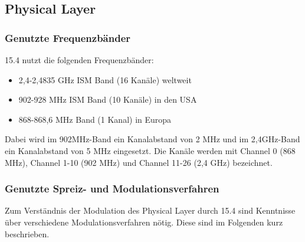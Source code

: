 \subsection{Physical Layer}
\subsubsection{Genutzte Frequenzbänder}
15.4 nutzt die folgenden Frequenzbänder:
\begin{itemize}
	\item 2,4-2,4835 GHz ISM Band (16 Kanäle) weltweit
	\item 902-928 MHz ISM Band (10 Kanäle) in den USA
	\item 868-868,6 MHz Band (1 Kanal) in Europa
\end{itemize}
Dabei wird im 902MHz-Band ein Kanalabstand von 2 MHz und im 2,4GHz-Band ein Kanalabstand von 5 MHz eingesetzt. Die Kanäle werden mit Channel 0 (868 MHz), Channel 1-10 (902 MHz) und Channel 11-26 (2,4 GHz) bezeichnet.
\subsubsection{Genutzte Spreiz- und Modulationsverfahren}
Zum Verständnis der Modulation des Physical Layer durch 15.4 sind Kenntnisse über verschiedene Modulationsverfahren nötig. Diese sind im Folgenden kurz beschrieben. \\

